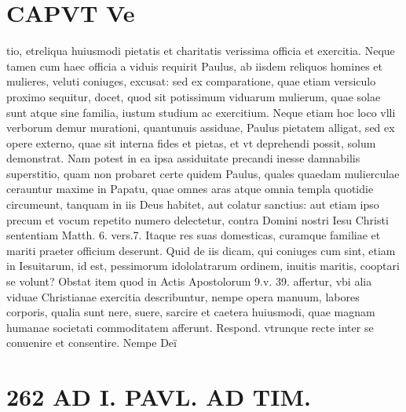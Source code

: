 \documentclass{article}
\begin{document}
\begin{pages}
\section*{CAPVT  Ve }
\marginpar{[ p.261 ]}\pstart tio, etreliqua huiusmodi pietatis et charitatis verissima officia et exercitia. Neque tamen cum haec officia a viduis requirit Paulus, ab iisdem reliquos homines et mulieres, veluti coniuges, excusat: sed ex comparatione, quae etiam versiculo proximo sequitur, docet, quod sit potissimum viduarum mulierum, quae solae sunt atque sine familia, iustum studium ac exercitium. Neque etiam hoc loco vlli verborum demur murationi, quantunuis assiduae, Paulus pietatem alligat, sed ex opere externo, quae sit interna fides et pietas, et vt deprehendi possit, solum demonstrat. Nam potest in ea ipsa assiduitate precandi inesse damnabilis superstitio, quam non probaret certe quidem Paulus, quales quaedam mulierculae cerauntur maxime in Papatu, quae omnes aras atque omnia templa quotidie circumeunt, tanquam in iis Deus habitet, aut colatur sanctius: aut etiam ipso precum et vocum repetito numero delectetur, contra Domini nostri Iesu Christi sententiam Matth. 6. vers.7. Itaque res suas domesticas, curamque familiae et mariti praeter officium deserunt. Quid de iis dicam, qui coniuges cum sint, etiam in Iesuitarum, id est, pessimorum idololatrarum ordinem, inuitis maritis, cooptari se volunt? Obstat item quod in Actis Apostolorum 9.v. 39. affertur, vbi alia viduae Christianae exercitia describuntur, nempe opera manuum, labores corporis, qualia sunt nere, suere, sarcire et caetera huiusmodi, quae magnam humanae societati commoditatem afferunt. Respond. vtrunque recte inter se conuenire et consentire. Nempe Deï  \pend
\section*{262 AD I. PAVL. AD TIM. }\pstart {}
{}

\end{pages}
\end{document}
